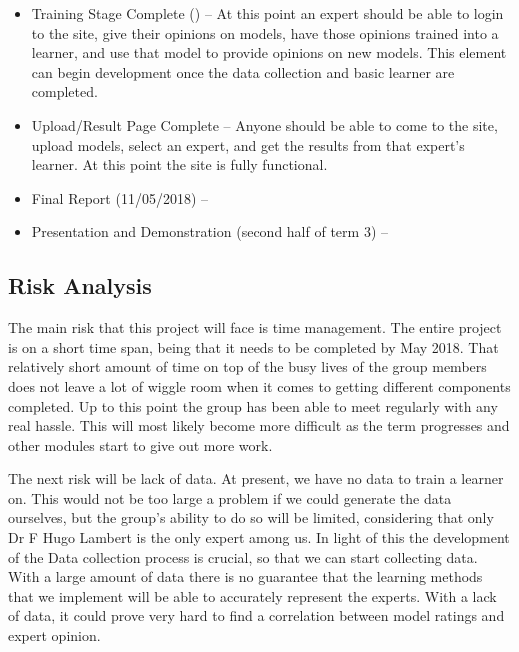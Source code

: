 \documentclass{ecmm427_assignment}
\begin{document}
\begin{itemize}
\item Training Stage Complete () – At this point an expert should be able to login to the site, give their opinions on models, have those opinions trained into a learner, and use that model to provide opinions on new models. This element can begin development once the data collection and basic learner are completed.

\item Upload/Result Page Complete – Anyone should be able to come to the site, upload models, select an expert, and get the results from that expert’s learner. At this point the site is fully functional.

\item Final Report (11/05/2018) –

\item Presentation and Demonstration (second half of term 3) –

\end{itemize}

\subsection{Risk Analysis}

\quad The main risk that this project will face is time management. The entire project is on a short time span, being that it needs to be completed by May 2018. That relatively short amount of time on top of the busy lives of the group members does not leave a lot of wiggle room when it comes to getting different components completed. Up to this point the group has been able to meet regularly with any real hassle. This will most likely become more difficult as the term progresses and other modules start to give out more work. \par

\quad The next risk will be lack of data. At present, we have no data to train a learner on. This would not be too large a problem if we could generate the data ourselves, but the group’s ability to do so will be limited, considering that only Dr F Hugo Lambert is the only expert among us. In light of this the development of the Data collection process is crucial, so that we can start collecting data. With a large amount of data there is no guarantee that the learning methods that we implement will be able to accurately represent the experts. With a lack of data, it could prove very hard to find a correlation between model ratings and expert opinion.\par
\end{document}
